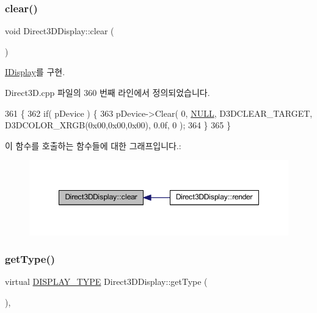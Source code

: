 \subsubsection{\texorpdfstring{clear()}{clear()}}
{\footnotesize\ttfamily void Direct3\+D\+Display\+::clear (\begin{DoxyParamCaption}{ }\end{DoxyParamCaption})\hspace{0.3cm}{\ttfamily [virtual]}}



\mbox{\hyperlink{class_i_display_affb8a8b5651d138058cdbd088ff3968d}{I\+Display}}를 구현.



Direct3\+D.\+cpp 파일의 360 번째 라인에서 정의되었습니다.


\begin{DoxyCode}
361 \{
362     \textcolor{keywordflow}{if}( pDevice ) \{
363         pDevice->Clear( 0, \mbox{\hyperlink{getopt1_8c_a070d2ce7b6bb7e5c05602aa8c308d0c4}{NULL}}, D3DCLEAR\_TARGET, D3DCOLOR\_XRGB(0x00,0x00,0x00), 0.0f, 0 );
364     \}
365 \}
\end{DoxyCode}
이 함수를 호출하는 함수들에 대한 그래프입니다.\+:
\nopagebreak
\begin{figure}[H]
\begin{center}
\leavevmode
\includegraphics[width=348pt]{class_direct3_d_display_a67b8e31e5bb726cb82efbfb0be90935f_icgraph}
\end{center}
\end{figure}
\mbox{\label{class_direct3_d_display_a517a805d2a5ebb732671851162920868}} 
\subsubsection{\texorpdfstring{get\+Type()}{getType()}}
{\footnotesize\ttfamily virtual \mbox{\hyperlink{_display_8h_aa50f63b0688d0250e0be64d8401d09a0}{D\+I\+S\+P\+L\+A\+Y\+\_\+\+T\+Y\+PE}} Direct3\+D\+Display\+::get\+Type (\begin{DoxyParamCaption}{ }\end{DoxyParamCaption})\hspace{0.3cm}{\ttfamily [inline]}, {\ttfamily [virtual]}}



